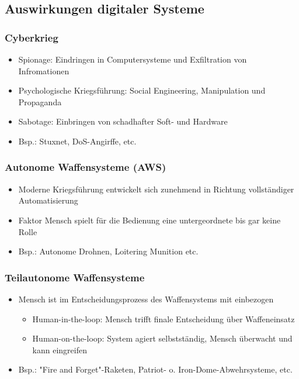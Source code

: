\documentclass[handout]{beamer}
\begin{document}
\subsection{Auswirkungen digitaler Systeme}

\begin{frame}
    \frametitle{Cyberkrieg}
    \begin{itemize}
        \item Spionage: Eindringen in Computersysteme und Exfiltration von Infromationen \cite{cyberkrieg}
        \item Psychologische Kriegsführung: Social Engineering, Manipulation und Propaganda \cite{cyberkrieg}
        \item Sabotage: Einbringen von schadhafter Soft- und Hardware \cite{cyberkrieg}
        \item Bsp.: Stuxnet, DoS-Angirffe, etc.
    \end{itemize}
\end{frame}

\begin{frame}
    \frametitle{Autonome Waffensysteme (AWS)}
    \begin{itemize}
        \item Moderne Kriegsführung entwickelt sich zunehmend in Richtung vollständiger Automatisierung
        \item Faktor Mensch spielt für die Bedienung eine untergeordnete bis gar keine Rolle \cite{amnesty}
        \item Bsp.: Autonome Drohnen, Loitering Munition etc. \cite{amnesty}
    \end{itemize}
\end{frame}

\begin{frame}
    \frametitle{Teilautonome Waffensysteme}
    \begin{itemize}
        \item Mensch ist im Entscheidungsprozess des Waffensystems mit einbezogen
        \begin{itemize}
            \item Human-in-the-loop: Mensch trifft finale Entscheidung über Waffeneinsatz \cite{kas}
            \item Human-on-the-loop: System agiert selbstständig, Mensch überwacht und kann eingreifen \cite{kas}
        \end{itemize}
        \item Bsp.: "Fire and Forget"-Raketen, Patriot- o. Iron-Dome-Abwehrsysteme, etc.
    \end{itemize}
\end{frame}
\end{document}
